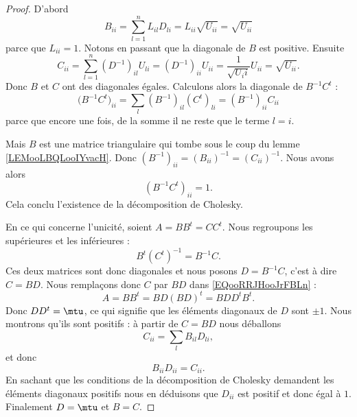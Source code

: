 \begin{proof}
    D'abord
    \begin{equation}
        B_{ii}=\sum_{l=1}^nL_{il}D_{li}=L_{ii}\sqrt{ U_{ii} }=\sqrt{ U_{ii} }
    \end{equation}
    parce que \( L_{ii}=1\). Notons en passant que la diagonale de \( B\) est positive.  Ensuite 
    \begin{equation}
        C_{ii}=\sum_{l=1}^n(D^{-1})_{il}U_{li}=(D^{-1})_{ii}U_{ii}=\frac{1}{ \sqrt{ U_ii } }U_{ii}=\sqrt{ U_{ii} }.
    \end{equation}
    Donc \( B\) et $C$ ont des diagonales égales. Calculons alors la diagonale de \( B^{-1}C^t\) :
    \begin{equation}
        \big( B^{-1}C^t \big)_{ii}=\sum_l(B^{-1})_{il}(C^t)_{li}=(B^{-1})_{ii}C_{ii}
    \end{equation}
    parce que encore une fois, de la somme il ne reste que le terme \( l=i\).

    Mais \( B\) est une matrice triangulaire qui tombe sous le coup du lemme \ref{LEMooLBQLooIYvacH}. Donc \( (B^{-1})_{ii}=(B_{ii})^{-1}=(C_{ii})^{-1}\). Nous avons alors
    \begin{equation}
        (B^{-1}C^t)_{ii}=1.
    \end{equation}
    Cela conclu l'existence de la décomposition de Cholesky.

    En ce qui concerne l'unicité, soient \( A=BB^t=CC^t\). Nous regroupons les supérieures et les inférieures :
    \begin{equation}        \label{EQooRRJHooJrFBLn}
        B^t(C^t)^{-1}=B^{-1}C.
    \end{equation}
    Ces deux matrices sont donc diagonales et nous posons \( D=B^{-1} C\), c'est à dire \( C=BD\). Nous remplaçons donc \( C\) par \( BD\) dans \eqref{EQooRRJHooJrFBLn} :
    \begin{equation}
        A=BB^t=BD(BD)^t=BDD^tB^t.
    \end{equation}
    Donc \( DD^t=\mtu\), ce qui signifie que les éléments diagonaux de \( D\) sont \( \pm 1\). Nous montrons qu'ils sont positifs : à partir de \( C=BD\) nous déballons 
    \begin{equation}
        C_{ii}=\sum_lB_{il}D_{li},
    \end{equation}
    et donc
    \begin{equation}
        B_{ii}D_{ii}=C_{ii}.
    \end{equation}
    En sachant que les conditions de la décomposition de Cholesky demandent les éléments diagonaux positifs nous en déduisons que \( D_{ii}\) est positif et donc égal à \( 1\). Finalement \( D=\mtu\) et \( B=C\).
\end{proof}

